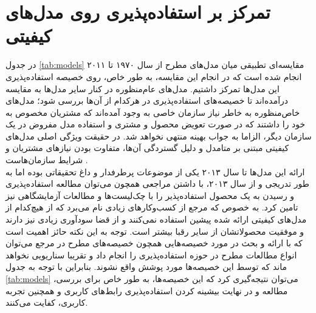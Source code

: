 \section{تمرکز بر استفاده‌پذیری روی مدل‌های کیفیتی}
در جدول
\ref{tab:models}
مقایسه‌ای تطبیقی میان مدل‌های مطرح از سال ۱۹۷۰ تا ۲۰۱۱ انجام شده است که در انجام این مقایسه، به طور خاص، روی خصیصه استفاده‌پذیری این مدل‌ها تمرکز داشتیم. مدل‌های عام‌منظوره در کنار سایر مدل‌ها به مقایسه درآمده‌اند تا خصیصه‌های استفاده‌پذیری در هرکدام از آن‌ها بررسی شود؛ مدل‌های خاص‌منظوره به خاطر نیاز سازمان خاصی به وجود آمده‌اند که مشتریان مخصوص به خود را داشتند که در صورت تعویض محصول و مشتری و استفاده مدل مفروض در یک سازمان دیگر، الزاما به جواب بهینه منتهی نخواهد شد. در حقیقت ویژگی اصلی مدل‌های کیفیتی مبتنی بر متامدل و دلیل گستردگی آن‌ها، متفاوت بودن نیازهای مشتریان و شرایط سازمان‌هاست
\cite{sommerville_software_2016}.\\
ارائه این مدل‌ها تا سال ۲۰۱۳ یکی از موضوعات پرطرفدار و داغ تحقیقاتی بوده اما به طور تدریجی و از سال ۲۰۱۳، با داشتن مراجعی همچون
\cite{albert_measuring_2013}
می‌توان مطالعه استفاده‌پذیری و رسیدن به یک محصول استفاده‌پذیر را با چک‌لیست‌ها و مطالعات آزمایشگاهی نیز تامین کرد. به خصوص که مرجع
\cite{wagner_software_2012}
از کسب‌وکارهای زیادی نام می‌برد که از هیچ‌کدام از مدل‌های کیفیتی ارائه شده پیشین استفاده نمی‌کنند و از قضا سودآوری زیادی نیز دارند و موفقیت محصولاتشان از سایر رقبا بیشتر است. توجه به این نکته حائز اهمیت است که با ارائه و بحث در مورد خصیصه‌هایی همچون خصیصه‌های مطرح در مرجع
\cite{albert_measuring_2013}
می‌توان انواع مطالعات مطرح در حوزه استفاده‌پذیری را انجام داد و تقریبا سناریویی نخواهد ماند که توسط این خصیصه‌ها مورد پوشش واقع نشوند. بنابراین با توجه به جدول
\ref{tab:models}
می‌توان نتیجه‌گیری کرد که این خصیصه‌ها، به طور خاص برای بررسی، مطالعه و در نهایت بیشینه کردن استفاده‌پذیری رابط‌های کاربری و همچنین تجربه کاربری، کفایت می‌کنند.
